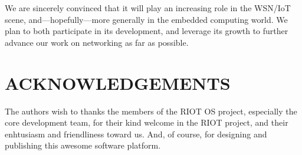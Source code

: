 \documentclass[a4paper,twoside]{article}
\begin{document}
We are sincerely convinced that it will play an increasing role in
the WSN/IoT scene, and---hopefully---more generally in the embedded
computing world. We plan to both participate in its development,
and leverage its growth to further advance our work on networking
as far as possible.


\section*{\uppercase{Acknowledgements}}

The authors wish to thanks the members of the RIOT OS project,
especially the core development team, for their kind welcome
in the RIOT project, and their enhtusiasm and friendliness
toward us. And, of course, for designing and publishing
this awesome software platform.


\vfill

{\small
}
\end{document}

